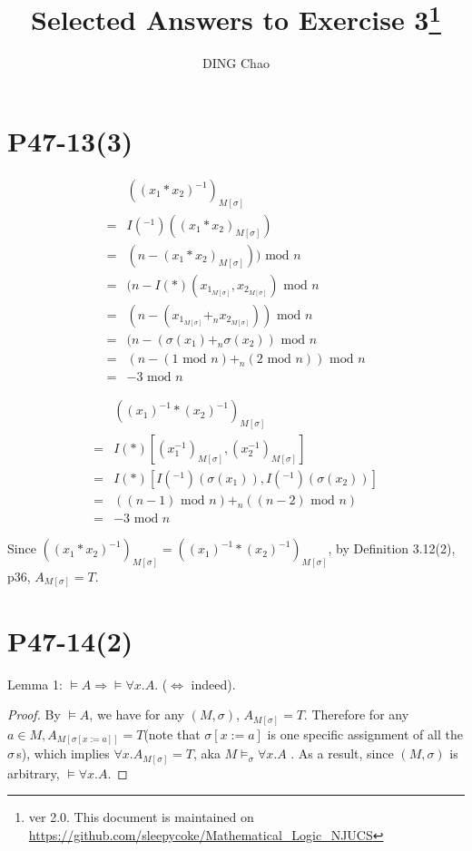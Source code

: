 \documentclass{article}
\author{DING Chao}
\title{Selected Answers to Exercise 3\footnote{ver 2.0. This document is maintained on \url{https://github.com/sleepycoke/Mathematical_Logic_NJUCS}}}
\begin{document}
\maketitle
\section{P47-13(3)}
\begin{align*}
	 &((x_1*x_2)^{-1})_{M[\sigma]}\\
	=&I(^{-1})((x_1*x_2)_{M[\sigma]})\\
	=&(n - (x_1*x_2)_{M[\sigma]})) \mbox{ mod } n\\
	=&(n - I(*)(x_{1_{M[\sigma]}}, x_{2_{M[\sigma]}})\text{ mod } n\\
	=&(n - (x_{1_{M[\sigma]}} +_n x_{2_{M[\sigma]}})) \mbox{ mod } n\\
	=&(n - (\sigma(x_1) +_n \sigma(x_2))  \mbox{ mod }  n\\
	=&(n - (1  \text{ mod }  n) +_n (2  \text{ mod }   n) )  \mbox{ mod }  n\\
	=&-3  \mbox{ mod }  n
\end{align*}

\bigbreak

\begin{align*}
&((x_1)^{-1}*(x_2)^{-1})_{M[\sigma]}\\
=&I(*)[(x_1^{-1})_{M[\sigma]}, (x_2^{-1})_{M[\sigma]}]\\
=&I(*)[I(^{-1})(\sigma(x_1)), I(^{-1})(\sigma(x_2))]\\
=&((n - 1) \mbox{ mod } n) +_n ((n - 2) \mbox{ mod } n)\\
=&-3 \mbox{ mod } n
\end{align*}

Since $((x_1*x_2)^{-1})_{M[\sigma]} = ((x_1)^{-1}*(x_2)^{-1})_{M[\sigma]}$, by Definition 3.12(2), p36, $A_{M[\sigma]} = T$. 

\section{P47-14(2)}
Lemma 1: $\models A \Rightarrow \models \forall x. A$. ($\Leftrightarrow$ indeed).

\begin{proof}
	By $\models A$, we have for any $(M, \sigma)$, $A_{M[\sigma]} = T$. Therefore for any $a \in M, A_{M[\sigma[x:=a]]} = T$(note that $\sigma[x:=a]$ is one specific assignment of all the $\sigma\,$s), 	which implies $\forall x.A _{M[\sigma]} = T$, aka $M \models _\sigma \forall x.A$ . As a result, since $(M, \sigma)$ is arbitrary, $\models \forall x. A$. 
\end{proof}
\end{document}

